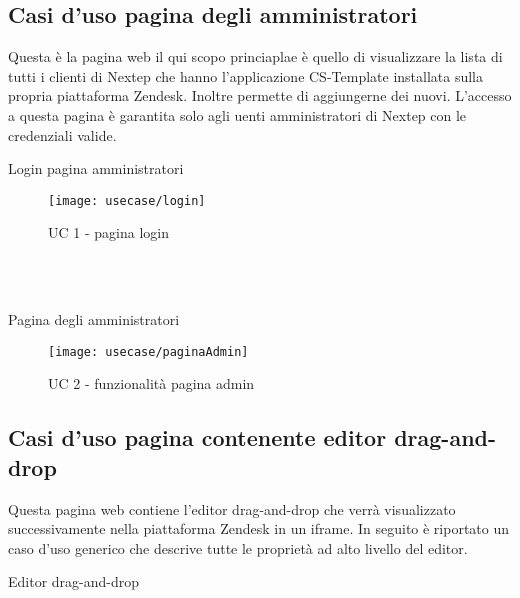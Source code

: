 \subsection{ Casi d'uso pagina degli amministratori}
Questa è la pagina web il qui scopo princiaplae è quello di visualizzare la lista di tutti i clienti di Nextep che hanno l'applicazione CS-Template installata sulla propria piattaforma Zendesk. Inoltre permette di aggiungerne dei nuovi. L'accesso a questa pagina è garantita solo agli uenti amministratori di Nextep con le credenziali valide.
\begin{usecase}{1}{Login pagina amministratori}

		\begin{figure}[!h] 
		\centering 
		\texttt{[image: usecase/login]} 
		\caption{UC 1 - pagina login}
	\end{figure}
\\ 
\\
\begin{usecase}{2}{Pagina degli amministratori}
	
	\begin{figure}[!h] 
		\centering 
		\texttt{[image: usecase/paginaAdmin]} 
		\caption{UC 2 - funzionalità pagina admin}
	\end{figure}
\end{usecase}
\newpage
\subsection{ Casi d'uso pagina contenente editor drag-and-drop}
Questa pagina web contiene l'editor drag-and-drop che verrà visualizzato successivamente nella piattaforma Zendesk in un iframe. In seguito è riportato un caso d'uso generico che descrive tutte le proprietà ad alto livello del editor.
\begin{usecase}{3}{Editor drag-and-drop}
	

\end{usecase}
\end{usecase}
